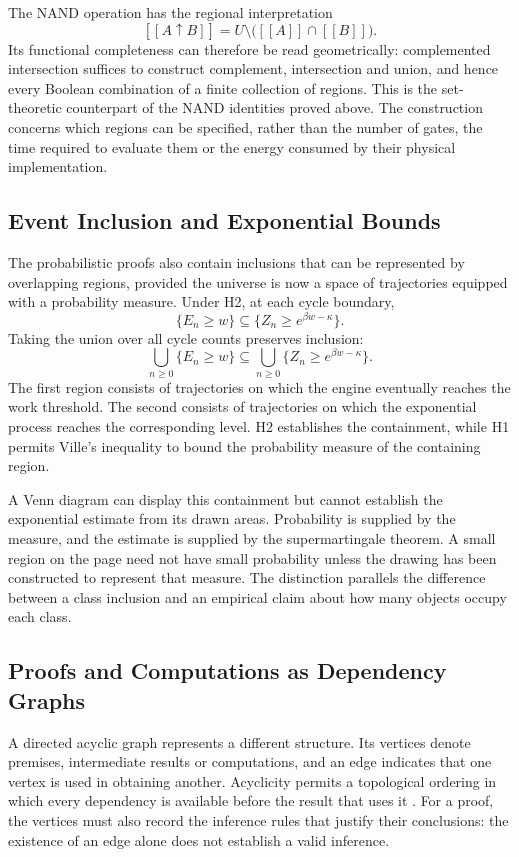 \documentclass[11pt]{article}
\theoremstyle{definition}
\theoremstyle{remark}
\newcommand{\llbracket}{[\![}
\newcommand{\rrbracket}{]\!]}
\newcommand{\nand}{\uparrow}
\begin{document}
The NAND operation has the regional interpretation
\[
\llbracket A\nand B\rrbracket
=
U\setminus
\big(\llbracket A\rrbracket\cap\llbracket B\rrbracket\big).
\]
Its functional completeness can therefore be read geometrically:
complemented intersection suffices to construct complement,
intersection and union, and hence every Boolean combination of a
finite collection of regions. This is the set-theoretic counterpart
of the NAND identities proved above. The construction concerns which
regions can be specified, rather than the number of gates, the time
required to evaluate them or the energy consumed by their physical
implementation.

\subsection{Event Inclusion and Exponential Bounds}

The probabilistic proofs also contain inclusions that can be
represented by overlapping regions, provided the universe is now a
space of trajectories equipped with a probability measure. Under H2,
at each cycle boundary,
\[
\{E_n\ge w\}
\subseteq
\{Z_n\ge e^{\beta w-\kappa}\}.
\]
Taking the union over all cycle counts preserves inclusion:
\[
\bigcup_{n\ge0}\{E_n\ge w\}
\subseteq
\bigcup_{n\ge0}
\{Z_n\ge e^{\beta w-\kappa}\}.
\]
The first region consists of trajectories on which the engine
eventually reaches the work threshold. The second consists of
trajectories on which the exponential process reaches the
corresponding level. H2 establishes the containment, while H1
permits Ville's inequality to bound the probability measure of the
containing region.

A Venn diagram can display this containment but cannot establish
the exponential estimate from its drawn areas. Probability is
supplied by the measure, and the estimate is supplied by the
supermartingale theorem. A small region on the page need not have
small probability unless the drawing has been constructed to
represent that measure. The distinction parallels the difference
between a class inclusion and an empirical claim about how many
objects occupy each class.

\subsection{Proofs and Computations as Dependency Graphs}

A directed acyclic graph represents a different structure. Its
vertices denote premises, intermediate results or computations, and
an edge indicates that one vertex is used in obtaining another.
Acyclicity permits a topological ordering in which every dependency
is available before the result that uses it \cite[Section~20.4]{cormen2022}. For a proof, the
vertices must also record the inference rules that justify their
conclusions: the existence of an edge alone does not establish a
valid inference.
\end{document}
